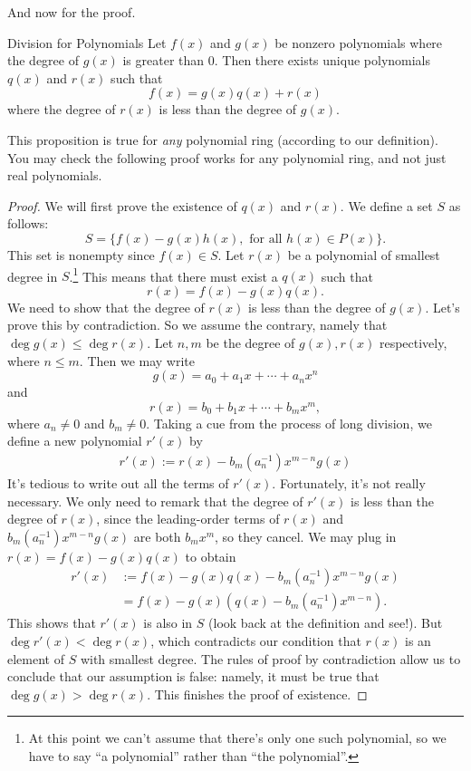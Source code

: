 And now for the proof.

\begin {prop} {Division for Polynomials}
Let $f(x)$ and $g(x)$ be nonzero polynomials where the degree of $g(x)$ is greater than 0.  Then there exists unique polynomials $q(x)$ and $r(x)$ such that 
\[
f(x) = g(x)q(x) + r(x)
\]
where the degree of $r(x)$ is less than the degree of $g(x)$.
\end {prop}

\begin {rem}
This proposition is true for \emph{any} polynomial ring (according to our definition). You may check the following proof works for any polynomial ring, and not just real polynomials.
\end{rem}


\begin{proof}
We will first prove the existence of $q(x)$ and $r(x)$. We define a set $S$ as follows: 
\[S = \{f(x) - g(x) h(x), \text{ for all } h(x) \in P(x) \}.\] 
 This set is nonempty since $f(x) \in
S$. 
Let
$r(x)$ be  a polynomial of smallest degree in $S$.\footnote{At this point we can't assume that there's only one such polynomial, so we have to say ``a polynomial'' rather than ``the polynomial''.} This means that there must exist a $q(x)$ such that  
\[
r(x) = f(x) - g(x) q(x).
\]
We need to show that the degree of $r(x)$ is less than the degree of
$g(x)$. Let's prove this by contradiction. So we assume the contrary, namely  that $\deg g(x) \leq \deg r(x)$. 
Let $n,m$ be the degree of $g(x),r(x)$ respectively, where $n \leq m$. Then we may write
\[
g(x) = a_0 + a_1 x + \cdots + a_n x^n
\]
and
\[
r(x) = b_0 + b_1 
x + \cdots + b_m x^m, \]
where $a_n \neq 0$ and $b_m \neq 0$. 
Taking a cue from the process of long division, we define a new polynomial $r'(x)$ by
\begin{align*}
r'(x) := r(x) - b_m(a_n^{-1}) x^{m-n}g(x)
\end{align*}
It's tedious to write out all the terms of $r'(x)$. Fortunately, it's not really necessary. We only need to remark that the degree of $r'(x)$ is less than the degree of $r(x)$, since the leading-order terms of $r(x)$ and $b_m(a_n^{-1}) x^{m-n}g(x)$ are both $b_m x^m$, so they cancel. We may plug in $r(x) = f(x) - g(x) q(x)$ to obtain
\begin{align*}
r'(x) &:=  f(x) - g(x) q(x) - b_m(a_n^{-1}) x^{m-n}g(x)\\
&= f(x) - g(x) \left( q(x) - b_m(a_n^{-1}) x^{m-n}\right).
\end{align*}
This shows that $r'(x)$ is also in $S$  (look back at the definition and see!).  But 
$\deg r'(x) < \deg r(x)$, which contradicts our condition that $r(x)$ is an element of $S$ with smallest degree. The rules of proof by contradiction allow us to conclude that our assumption is false: namely, it must be true that $\deg g(x) > \deg r(x)$.
This finishes the proof of existence.


\end{proof}
